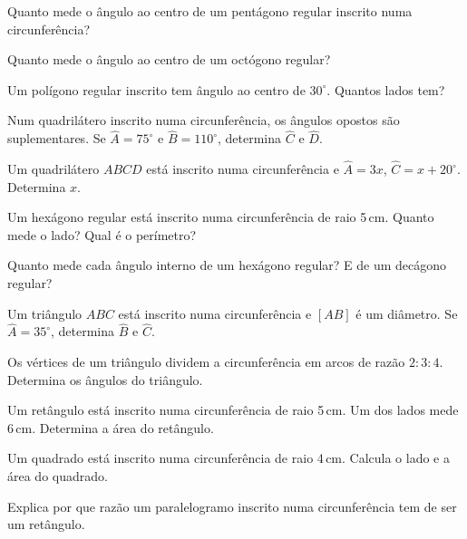 \documentclass[12pt]{article}
\begin{document}
\begin{exercicios}
  \item Quanto mede o ângulo ao centro de um pentágono regular inscrito numa circunferência?
  \item Quanto mede o ângulo ao centro de um octógono regular?
  \item Um polígono regular inscrito tem ângulo ao centro de $30^\circ$. Quantos lados tem?
  \item Num quadrilátero inscrito numa circunferência, os ângulos opostos são suplementares. Se $\hat{A} = 75^\circ$ e $\hat{B} = 110^\circ$, determina $\hat{C}$ e $\hat{D}$.
  \item Um quadrilátero $ABCD$ está inscrito numa circunferência e $\hat{A} = 3x$, $\hat{C} = x + 20^\circ$. Determina $x$.
  \item Um hexágono regular está inscrito numa circunferência de raio 5\,cm. Quanto mede o lado? Qual é o perímetro?
  \item Quanto mede cada ângulo interno de um hexágono regular? E de um decágono regular?
\end{exercicios}

\begin{exercicios}
  \item Um triângulo $ABC$ está inscrito numa circunferência e $[AB]$ é um diâmetro. Se $\hat{A} = 35^\circ$, determina $\hat{B}$ e $\hat{C}$.
  \item Os vértices de um triângulo dividem a circunferência em arcos de razão $2:3:4$. Determina os ângulos do triângulo.
  \item Um retângulo está inscrito numa circunferência de raio 5\,cm. Um dos lados mede 6\,cm. Determina a área do retângulo.
  \item Um quadrado está inscrito numa circunferência de raio 4\,cm. Calcula o lado e a área do quadrado.
  \item Explica por que razão um paralelogramo inscrito numa circunferência tem de ser um retângulo.
\end{exercicios}
\end{document}
